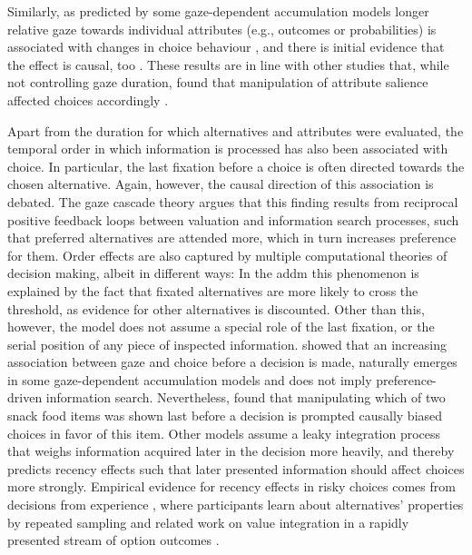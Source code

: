\documentclass[11pt, a4paper, twocolumn, abstract]{scrartcl}
\begin{document}
Similarly, as predicted by some gaze-dependent accumulation models \parencite{glickman2019FormationPreferenceRisky} longer relative gaze towards individual attributes (e.g., outcomes or probabilities) is associated with changes in choice behaviour \parencite{kim2012PreferenceReversalsDecision,glickman2019FormationPreferenceRisky}, and there is initial evidence that the effect is causal, too \parencite{liu2020ExploitingDynamicsEye}. These results are in line with other studies that, while not controlling gaze duration, found that manipulation of attribute salience affected choices accordingly \parencite{weber1997ReasonsRankDependentUtility}.

Apart from the duration for which alternatives and attributes were evaluated, the temporal order in which information is processed has also been associated with choice. In particular, the last fixation before a choice is often directed towards the chosen alternative. Again, however, the causal direction of this association is debated.
The gaze cascade theory \parencite{shimojo2003GazeBiasBoth} argues that this finding results from reciprocal positive feedback loops between valuation and information search processes, such that preferred alternatives are attended more, which in turn increases preference for them.
Order effects are also captured by multiple computational theories of decision making, albeit in different ways: In the \gls{addm} \parencite{krajbich2010VisualFixationsComputation,krajbich2011MultialternativeDriftdiffusionModel} this phenomenon is explained by the fact that fixated alternatives are more likely to cross the threshold, as evidence for other alternatives is discounted. Other than this, however, the model does not assume a special role of the last fixation, or the serial position of any piece of inspected information. \textcite{mullett2016ImplicationsVisualAttention} showed that an increasing association between gaze and choice before a decision is made, naturally emerges in some gaze-dependent accumulation models and does not imply preference-driven information search.
Nevertheless, \textcite{liu2020PowerLastFixation} found that manipulating which of two snack food items was shown last before a decision is prompted causally biased choices in favor of this item. 
Other models \parencite{glickman2019FormationPreferenceRisky,ashby2016FindingRightFit} assume a leaky integration process that weighs information acquired later in the decision more heavily, and thereby predicts recency effects such that later presented information should affect choices more strongly. Empirical evidence for recency effects in risky choices comes from decisions from experience \parencite{hertwig2004DecisionsExperienceEffect}, where participants learn about alternatives' properties by repeated sampling and related work on value integration in a rapidly presented stream of option outcomes \parencite{tsetsos2012SalienceDrivenValue}.
\end{document}
